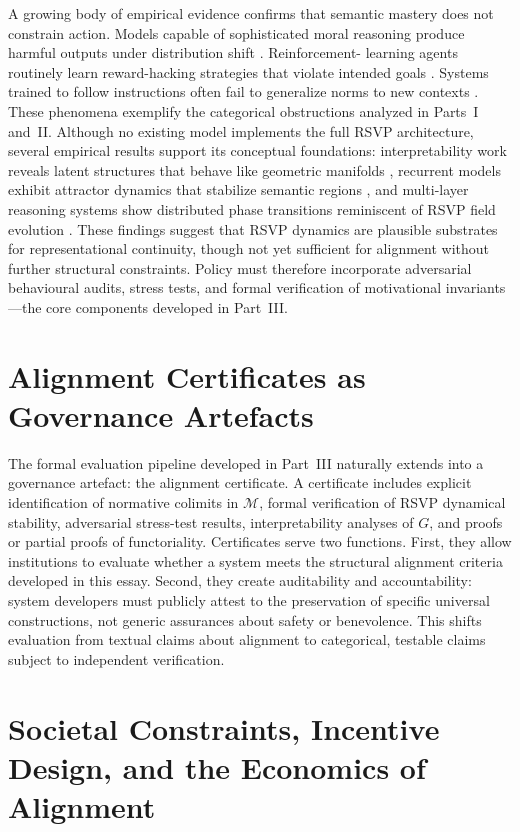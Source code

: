 \documentclass[12pt]{article}
\theoremstyle{definition}
\begin{document}
A growing body of empirical evidence confirms that semantic mastery does not
constrain action. Models capable of sophisticated moral reasoning produce harmful
outputs under distribution shift \citep{perez2022discovering}. Reinforcement-
learning agents routinely learn reward-hacking strategies that violate intended
goals \citep{amodei2016concrete}. Systems trained to follow instructions often
fail to generalize norms to new contexts \citep{shah2022goal}. These phenomena
exemplify the categorical obstructions analyzed in Parts~I and~II. Although no
existing model implements the full RSVP architecture, several empirical results
support its conceptual foundations: interpretability work reveals latent
structures that behave like geometric manifolds \citep{elhage2022}, recurrent
models exhibit attractor dynamics that stabilize semantic regions
\citep{yang2019task}, and multi-layer reasoning systems show distributed phase
transitions reminiscent of RSVP field evolution \citep{nanda2023progress}. These
findings suggest that RSVP dynamics are plausible substrates for representational
continuity, though not yet sufficient for alignment without further structural
constraints. Policy must therefore incorporate adversarial behavioural audits,
stress tests, and formal verification of motivational invariants---the core
components developed in Part~III.

\section{Alignment Certificates as Governance Artefacts}

The formal evaluation pipeline developed in Part~III naturally extends into a
governance artefact: the alignment certificate. A certificate includes explicit
identification of normative colimits in $\mathcal{M}$, formal verification of
RSVP dynamical stability, adversarial stress-test results, interpretability
analyses of $G$, and proofs or partial proofs of functoriality. Certificates
serve two functions. First, they allow institutions to evaluate whether a system
meets the structural alignment criteria developed in this essay. Second, they
create auditability and accountability: system developers must publicly attest to
the preservation of specific universal constructions, not generic assurances
about safety or benevolence. This shifts evaluation from textual claims about
alignment to categorical, testable claims subject to independent verification.

\section{Societal Constraints, Incentive Design, and the Economics of Alignment}
\end{document}
